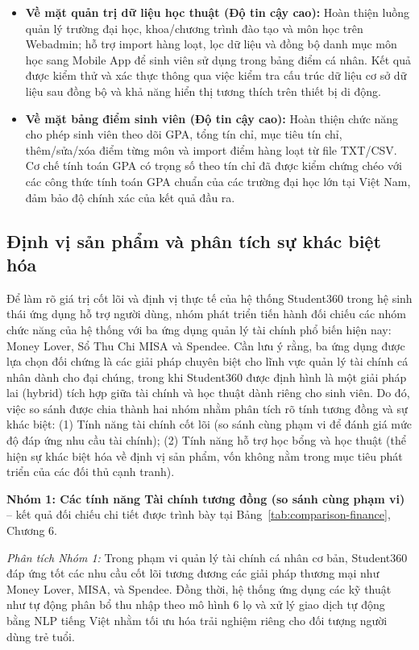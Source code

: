 \begin{itemize}
    \item \textbf{Về mặt quản trị dữ liệu học thuật (Độ tin cậy cao):} Hoàn thiện luồng quản lý trường đại học, khoa/chương trình đào tạo và môn học trên Webadmin; hỗ trợ import hàng loạt, lọc dữ liệu và đồng bộ danh mục môn học sang Mobile App để sinh viên sử dụng trong bảng điểm cá nhân. Kết quả được kiểm thử và xác thực thông qua việc kiểm tra cấu trúc dữ liệu cơ sở dữ liệu sau đồng bộ và khả năng hiển thị tương thích trên thiết bị di động.
    \item \textbf{Về mặt bảng điểm sinh viên (Độ tin cậy cao):} Hoàn thiện chức năng cho phép sinh viên theo dõi GPA, tổng tín chỉ, mục tiêu tín chỉ, thêm/sửa/xóa điểm từng môn và import điểm hàng loạt từ file TXT/CSV. Cơ chế tính toán GPA có trọng số theo tín chỉ đã được kiểm chứng chéo với các công thức tính toán GPA chuẩn của các trường đại học lớn tại Việt Nam, đảm bảo độ chính xác của kết quả đầu ra.
\end{itemize}

\subsection{Định vị sản phẩm và phân tích sự khác biệt hóa}
Để làm rõ giá trị cốt lõi và định vị thực tế của hệ thống Student360 trong hệ sinh thái ứng dụng hỗ trợ người dùng, nhóm phát triển tiến hành đối chiếu các nhóm chức năng của hệ thống với ba ứng dụng quản lý tài chính phổ biến hiện nay: Money Lover, Sổ Thu Chi MISA và Spendee. Cần lưu ý rằng, ba ứng dụng được lựa chọn đối chứng là các giải pháp chuyên biệt cho lĩnh vực quản lý tài chính cá nhân dành cho đại chúng, trong khi Student360 được định hình là một giải pháp lai (hybrid) tích hợp giữa tài chính và học thuật dành riêng cho sinh viên. Do đó, việc so sánh được chia thành hai nhóm nhằm phân tích rõ tính tương đồng và sự khác biệt: (1) Tính năng tài chính cốt lõi (so sánh cùng phạm vi để đánh giá mức độ đáp ứng nhu cầu tài chính); (2) Tính năng hỗ trợ học bổng và học thuật (thể hiện sự khác biệt hóa về định vị sản phẩm, vốn không nằm trong mục tiêu phát triển của các đối thủ cạnh tranh).

\textbf{Nhóm 1: Các tính năng Tài chính tương đồng (so sánh cùng phạm vi)} -- kết quả đối chiếu chi tiết được trình bày tại Bảng~\ref{tab:comparison-finance}, Chương 6.

\textit{Phân tích Nhóm 1:} Trong phạm vi quản lý tài chính cá nhân cơ bản, Student360 đáp ứng tốt các nhu cầu cốt lõi tương đương các giải pháp thương mại như Money Lover, MISA, và Spendee. Đồng thời, hệ thống ứng dụng các kỹ thuật như tự động phân bổ thu nhập theo mô hình 6 lọ và xử lý giao dịch tự động bằng NLP tiếng Việt nhằm tối ưu hóa trải nghiệm riêng cho đối tượng người dùng trẻ tuổi.

